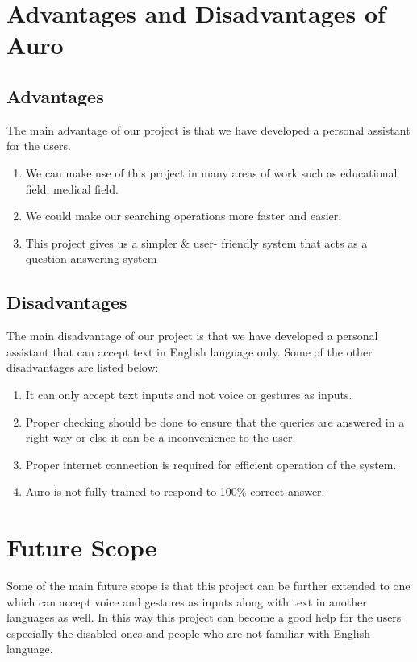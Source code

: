 \section{Advantages and Disadvantages of Auro}
\subsection*{Advantages}
The main advantage of our project is that we have developed a personal assistant for the users.

\begin{enumerate}

\item We can make use of this project in many areas of work such as educational field, medical field.
\item We could make our searching operations more faster and easier.
\item This project gives us a simpler & user- friendly system that acts as a question-answering system

\end{enumerate}

\subsection*{Disadvantages}
The main disadvantage of our project is that we have developed a personal assistant that can accept text in English language only.
Some of the other disadvantages are listed below:
\begin{enumerate}

\item It can only accept text inputs and not voice or gestures as inputs.

\item Proper checking should be done to ensure that the queries are answered in a right way or else it can be a inconvenience to the user.

\item Proper internet connection is required for efficient operation of the system.

\item Auro is not fully trained to respond to 100\% correct answer.

\end{enumerate}

\section{Future Scope}
Some of the main future scope is that this project can be further extended to one which can accept voice and gestures as inputs along with text in another languages as well. In this way this project can become a good help for the users especially the disabled ones and people who are not familiar with English language.

